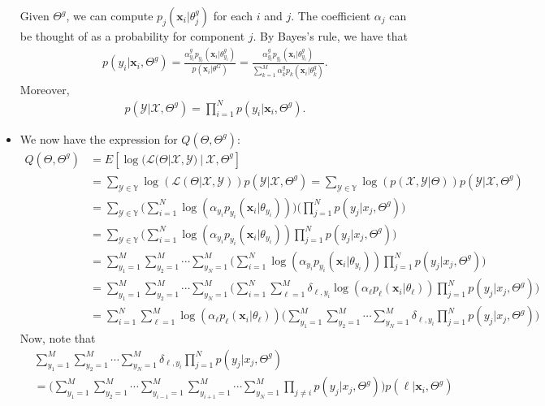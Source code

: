 \documentclass[10pt]{article}
\newcommand{\likelihood}{\mathcal{L}}
\newcommand{\X}{\mathcal{X}}
\newcommand{\Y}{\mathcal{Y}}
\newcommand{\x}{\mathbf{x}}
\begin{document}
\begin{itemize}
    Given $\Theta^g$, we can compute $p_j(\x_i| \theta_j^g)$ for each $i$ and $j$. The coefficient $\alpha_j$ can be thought of as a probability for component $j$. By Bayes's rule, we have that
    \begin{align*}
      p(y_i|\x_i, \Theta^g) 
      = \frac{\alpha_{y_i}^g p_{y_i}(\x_i|\theta^g_{y_i})}{p(\x_i|\theta^G)}
      = \frac{\alpha_{y_i}^g p_{y_i}(\x_i|\theta^g_{y_i})}{\sum_{k=1}^M \alpha_k^g p_k(\x_i|\theta^g_k)}.
    \end{align*}
    Moreover,
    \begin{align*}
      p(\Y|\X, \Theta^g) = \prod_{i=1}^N p(y_i|\x_i,\Theta^g).
    \end{align*}
    
    \item We now have the expression for $Q(\Theta, \Theta^g)$:
    \begin{align*}
      Q(\Theta,\Theta^g) 
      &= E[\log(\likelihood(\Theta|\X,\Y)\ |\ \X, \Theta^g]\\
      &= \sum_{\Y \in \mathbb{Y}} \log(\likelihood(\Theta|\X,\Y)) p(\Y|\X,\Theta^g)
      = \sum_{\Y \in \mathbb{Y}} \log(p(\X,\Y|\Theta)) p(\Y|\X,\Theta^g)\\
      &= \sum_{\Y \in \mathbb{Y}} \bigg( \sum_{i=1}^N \log(\alpha_{y_i} p_{y_i}(\x_i|\theta_{y_i})) \bigg) \bigg( \prod_{j=1}^N p(y_j|x_j,\Theta^g) \bigg)\\
      &= \sum_{\Y \in \mathbb{Y}} \bigg( \sum_{i=1}^N \log(\alpha_{y_i} p_{y_i}(\x_i|\theta_{y_i})) \prod_{j=1}^N p(y_j|x_j,\Theta^g) \bigg)\\
      &= \sum_{y_1=1}^M \sum_{y_2=1}^M \dotsb \sum_{y_N=1}^M \bigg( \sum_{i=1}^N \log(\alpha_{y_i} p_{y_i}(\x_i|\theta_{y_i})) \prod_{j=1}^N p(y_j|x_j,\Theta^g) \bigg)\\
      &= \sum_{y_1=1}^M \sum_{y_2=1}^M \dotsb \sum_{y_N=1}^M \bigg( \sum_{i=1}^N \sum_{\ell=1}^M \delta_{\ell,y_i} \log(\alpha_{\ell} p_{\ell}(\x_i|\theta_{\ell})) \prod_{j=1}^N p(y_j|x_j,\Theta^g) \bigg)\\
      &= \sum_{i=1}^N \sum_{\ell=1}^M \log(\alpha_{\ell} p_{\ell}(\x_i|\theta_{\ell})) \bigg( \sum_{y_1=1}^M \sum_{y_2=1}^M \dotsb \sum_{y_N=1}^M \delta_{\ell,y_i} \prod_{j=1}^N p(y_j|x_j,\Theta^g) \bigg)
    \end{align*}
    Now, note that
    \begin{align*}
      & \sum_{y_1=1}^M \sum_{y_2=1}^M \dotsb \sum_{y_N=1}^M \delta_{\ell,y_i} \prod_{j=1}^N p(y_j|x_j,\Theta^g)\\
      &= \bigg( \sum_{y_1=1}^M \sum_{y_2=1}^M \dotsb \sum_{y_{i-1}=1}^M \sum_{y_{i+1}=1}^M \dotsb \sum_{y_N=1}^M  \prod_{j\neq i} p(y_j|x_j,\Theta^g) \bigg) p(\ell|\x_i,\Theta^g)\\

\end{align*}
\end{itemize}
\end{document}
